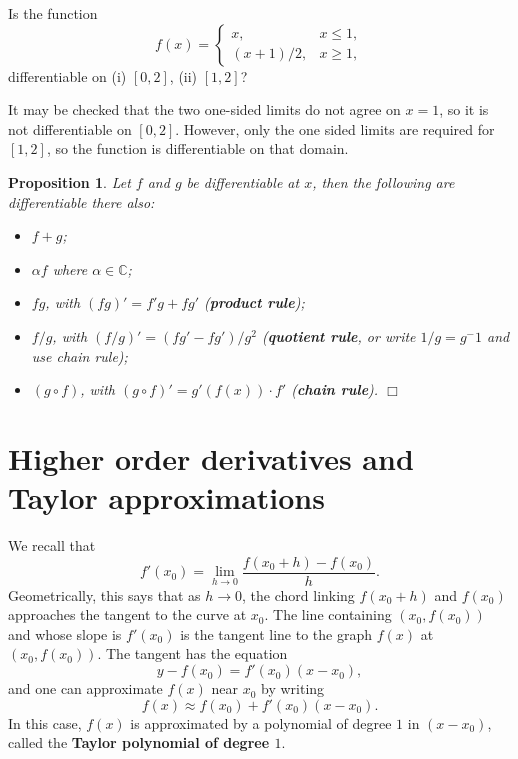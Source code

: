 \documentclass[letter-paper]{tufte-book}
\newtheorem{proposition}[theorem]{\color{pastel-blue}Proposition}
\newenvironment{example}[1][Example]{\begin{trivlist}
\item[\hskip \labelsep {\bfseries #1}]}{\end{trivlist}}
\newcommand\Def[1]{\textbf{#1}}
\newcommand{\qedwhite}{\hfill \ensuremath{\Box}}
\begin{document}
\begin{example}
  Is the function
  \begin{equation*}
    f(x)=\begin{cases}x, & x\leq 1,\\ (x+1)/2, & x\geq 1,\end{cases}
  \end{equation*}
  differentiable on (i) $[0,2]$, (ii) $[1,2]$?
  
  It may be checked that the two one-sided limits do not agree on $x=1$, so it
  is not differentiable on $[0,2]$. However, only the one sided limits are
  required for $[1,2]$, so the function is differentiable on that domain.
\end{example}

\begin{proposition}
  Let $f$ and $g$ be differentiable at $x$, then the following are
  differentiable there also:
  \begin{itemize}
    \item $f+g$;
    \item $\alpha f$ where $\alpha\in\mathbb{C}$;
    \item $fg$, with $(fg)'=f'g + fg'$ (\Def{product rule});
    \item $f/g$, with $(f/g)'=(fg'-fg')/g^2$ (\Def{quotient rule}, or
    write $1/g=g^-1$ and use chain rule);
    \item $(g\circ f)$, with $(g\circ f)'=g'(f(x))\cdot f'$ (\Def{chain
    rule}). \qedwhite
  \end{itemize}
\end{proposition}


\section{Higher order derivatives and Taylor approximations}

We recall that
\begin{equation*}
  f'(x_0)=\lim_{h\to 0}\frac{f(x_0+h)-f(x_0)}{h}.
\end{equation*}
Geometrically, this says that as $h\to 0$, the chord linking $f(x_0+h)$ and
$f(x_0)$ approaches the tangent to the curve at $x_0$. The line containing
$(x_0,f(x_0))$ and whose slope is $f'(x_0)$ is the tangent line to the graph
$f(x)$ at $(x_0,f(x_0))$. The tangent has the equation
\begin{equation*}
  y-f(x_0)=f'(x_0)(x-x_0),
\end{equation*}
and one can approximate $f(x)$ near $x_0$ by writing
\begin{equation*}
  f(x)\approx f(x_0)+f'(x_0)(x-x_0).
\end{equation*}
In this case, $f(x)$ is approximated by a polynomial of degree $1$ in $(x-x_0)$,
called the \Def{Taylor polynomial of degree $1$}.
\end{document}

